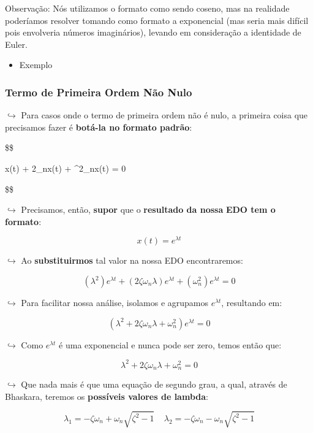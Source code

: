 \documentclass[]{article}
\providecommand{\tightlist}{%
  \setlength{\itemsep}{0pt}\setlength{\parskip}{0pt}}
\begin{document}
  Observação: Nós utilizamos o formato como sendo coseno, mas na realidade
  poderíamos resolver tomando como formato a exponencial (mas seria mais
  difícil pois envolveria números imaginários), levando em consideração a
  identidade de Euler.

  \begin{itemize}
  \tightlist
  \item
    Exemplo
  \end{itemize}

  \hypertarget{termo-de-primeira-ordem-nuxe3o-nulo}{%
  \subsubsection{Termo de Primeira Ordem Não
  Nulo}\label{termo-de-primeira-ordem-nuxe3o-nulo}}

  \(\hookrightarrow\) Para casos onde o termo de primeira ordem não é
  nulo, a primeira coisa que precisamos fazer é \textbf{botá-la no formato
  padrão}:

  \$\$

  \ddot x(t) + 2\zeta \omega \_n\dot x(t) + \omega\^{}2\_nx(t) = 0

  \$\$

  \(\hookrightarrow\) Precisamos, então, \textbf{supor} que o
  \textbf{resultado da nossa} \textbf{EDO tem o formato}:

  \[
  x(t) = e^{\lambda t}
  \]

  \(\hookrightarrow\) Ao \textbf{substituirmos} tal valor na nossa EDO
  encontraremos:

  \[
  (\lambda^2)e^{\lambda t} + (2\zeta \omega_n \lambda )e^{\lambda t} + (\omega_n^2) e^{\lambda t} = 0
  \]

  \(\hookrightarrow\) Para facilitar nossa análise, isolamos e agrupamos
  \(e^{\lambda t}\), resultando em:

  \[
  (\lambda^2 + 2\zeta \omega_n \lambda + \omega_n^2) e^{\lambda t} = 0
  \]

  \(\hookrightarrow\) Como \(e^{\lambda t}\) é uma exponencial e nunca
  pode ser zero, temos então que:

  \[
  \lambda^2 + 2\zeta \omega_n \lambda + \omega_n^2= 0
  \]

  \(\hookrightarrow\) Que nada mais é que uma equação de segundo grau, a
  qual, através de Bhaskara, teremos os \textbf{possíveis valores de
  lambda}:

  \[
  \lambda_1 = -\zeta\omega_n +\omega_n\sqrt{\zeta^2 - 1} \ \ \ \ \ \lambda_2 = -\zeta\omega_n -\omega_n\sqrt{\zeta^2 - 1}
  \]
\end{document}
